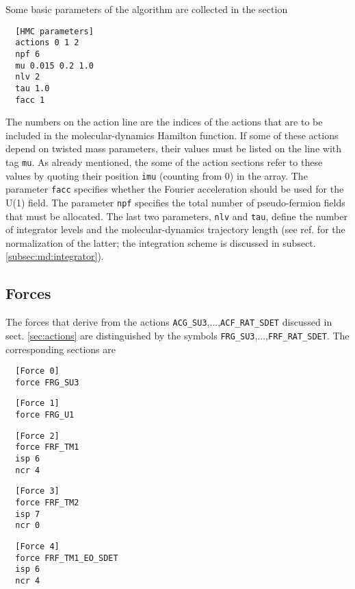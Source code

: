 \documentclass[11pt,fleqn]{article}
\begin{document}
Some basic parameters of the algorithm are collected in the section
%
\begin{verbatim}
  [HMC parameters]
  actions 0 1 2
  npf 6
  mu 0.015 0.2 1.0
  nlv 2
  tau 1.0
  facc 1
\end{verbatim}
%
The numbers on the action line are the indices of the actions that are to be
included in the molecular-dynamics Hamilton function. If some of these actions
depend on twisted mass parameters, their values must be listed on the line with
tag \texttt{mu}. As already mentioned, the some of the action sections refer to
these values by quoting their position \texttt{imu} (counting from 0) in the
array. The parameter \texttt{facc} specifies whether the Fourier acceleration
should be used for the U(1) field. The parameter \texttt{npf} specifies the
total number of pseudo-fermion fields that must be allocated. The last two
parameters, \texttt{nlv} and \texttt{tau}, define the number of integrator
levels and the molecular-dynamics trajectory length (see ref.
\cite{openQCD:forces} for the normalization of the latter; the integration
scheme is discussed in subsect. \ref{subsec:md:integrator}).



\subsection{Forces}
\label{subsec:md:forces}

The forces that derive from the actions
\texttt{ACG\_SU3},...,\texttt{ACF\_RAT\_SDET} discussed in sect.
\ref{sec:actions} are distinguished by the symbols
\texttt{FRG\_SU3},...,\texttt{FRF\_RAT\_SDET}. The corresponding sections are
%
\begin{verbatim}
  [Force 0]
  force FRG_SU3
\end{verbatim}

\begin{verbatim}
  [Force 1]
  force FRG_U1
\end{verbatim}

\begin{verbatim}
  [Force 2]
  force FRF_TM1
  isp 6
  ncr 4
\end{verbatim}

\begin{verbatim}
  [Force 3]
  force FRF_TM2
  isp 7
  ncr 0
\end{verbatim}

\begin{verbatim}
  [Force 4]
  force FRF_TM1_EO_SDET
  isp 6
  ncr 4
\end{verbatim}
\end{document}
